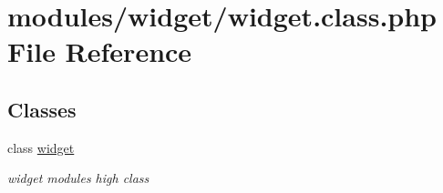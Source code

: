 \hypertarget{widget_8class_8php}{}\section{modules/widget/widget.class.\+php File Reference}
\label{widget_8class_8php}
\subsection*{Classes}
\begin{DoxyCompactItemize}
\item 
class \hyperlink{classwidget}{widget}
\begin{DoxyCompactList}\small\item\em widget module\textquotesingle{}s high class \end{DoxyCompactList}\end{DoxyCompactItemize}
